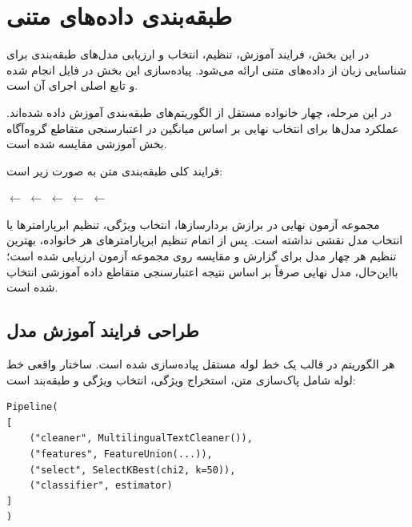 \documentclass[12pt,a4paper,oneside]{report}
\begin{document}
\section{طبقه‌بندی داده‌های متنی}

در این بخش، فرایند آموزش، تنظیم، انتخاب و ارزیابی مدل‌های طبقه‌بندی برای شناسایی زبان از داده‌های متنی ارائه می‌شود. پیاده‌سازی این بخش در فایل
انجام شده و تابع اصلی اجرای آن
است.

در این مرحله، چهار خانواده مستقل از الگوریتم‌های طبقه‌بندی آموزش داده شده‌اند. عملکرد مدل‌ها برای انتخاب نهایی بر اساس میانگین
در اعتبارسنجی متقاطع گروه‌آگاه بخش آموزشی مقایسه شده است.

فرایند کلی طبقه‌بندی متن به صورت زیر است:

\begin{center}
$\longleftarrow$
$\longleftarrow$
$\longleftarrow$
$\longleftarrow$
$\longleftarrow$
\end{center}

مجموعه آزمون نهایی در برازش بردارسازها، انتخاب ویژگی، تنظیم ابرپارامترها یا انتخاب مدل نقشی نداشته است. پس از اتمام تنظیم ابرپارامترهای هر خانواده، بهترین تنظیم هر چهار مدل برای گزارش و مقایسه روی مجموعه آزمون ارزیابی شده است؛ بااین‌حال، مدل نهایی صرفاً بر اساس نتیجه اعتبارسنجی متقاطع داده آموزشی انتخاب شده است.


\subsection{طراحی فرایند آموزش مدل}

هر الگوریتم در قالب یک خط لوله مستقل پیاده‌سازی شده است. ساختار واقعی خط لوله شامل پاک‌سازی متن، استخراج ویژگی، انتخاب ویژگی و طبقه‌بند است:

\begin{latin}
\begin{verbatim}
Pipeline(
[
    ("cleaner", MultilingualTextCleaner()),
    ("features", FeatureUnion(...)),
    ("select", SelectKBest(chi2, k=50)),
    ("classifier", estimator)
]
)
\end{verbatim}
\end{latin}
\end{document}
